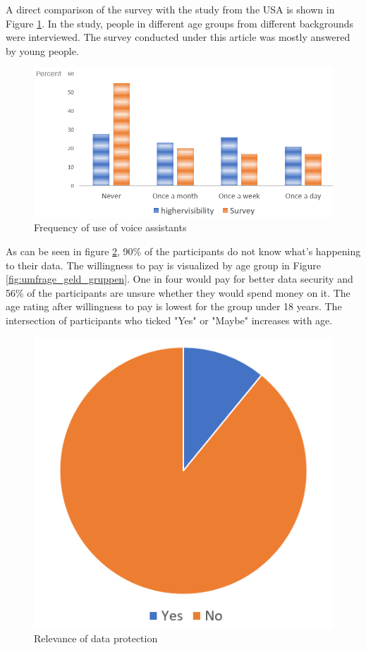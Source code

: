 A direct comparison of the survey with the study from the USA is shown in Figure \ref{fig: survey_base}. In the study, people in different age groups from different backgrounds were interviewed. The survey conducted under this article was mostly answered by young people.
\begin{figure}[h]
	\centering
	\includegraphics[width=0.9\linewidth]{Picture/umfrage_haeufigkeit}
	\caption[Frequency of use of voice assistants]{Frequency of use of voice assistants}
	\label{fig: survey_base}
\end{figure} 

As can be seen in figure \ref{fig:umfrage_datenschutz}, 90\% of the participants do not know what's happening to their data. The willingness to pay is visualized by age group in Figure \ref{fig:umfrage_geld_gruppen}. One in four would pay for better data security and 56\% of the participants are unsure whether they would spend money on it. The age rating after willingness to pay is lowest for the group under 18 years. The intersection of participants who ticked "Yes" or "Maybe" increases with age.

\begin{figure}[h]
	\centering
	\includegraphics[width=0.5\linewidth]{Picture/umfrage_datenschutz}
	\caption[Relevance of data protection]{Relevance of data protection}
	\label{fig:umfrage_datenschutz}
\end{figure}


